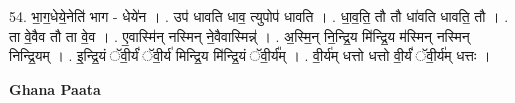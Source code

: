 \documentclass[17pt]{extarticle}
\begin{document}
54. भा॒ग॒धेये॒नेति॑ भाग - धेये॑न । . उप॑ धावति धाव॒ त्युपोप॑ धावति । . धा॒व॒ति॒ तौ तौ धा॑वति धावति॒ तौ । . ता वे॒वैव तौ ता वे॒व । . ए॒वास्मि॑न् नस्मिन् ने॒वैवास्मिन्न्॑ । . अ॒स्मि॒न् नि॒न्द्रि॒य मि॑न्द्रि॒य म॑स्मिन् नस्मिन् निन्द्रि॒यम् । . इ॒न्द्रि॒यं ॅवी॒र्यं॑ ॅवी॒र्य॑ मिन्द्रि॒य मि॑न्द्रि॒यं ॅवी॒र्य᳚म् । . वी॒र्य॑म् धत्तो धत्तो वी॒र्यं॑ ॅवी॒र्य॑म् धत्तः । \newline

\textbf{Ghana Paata } \newline
\end{document}
